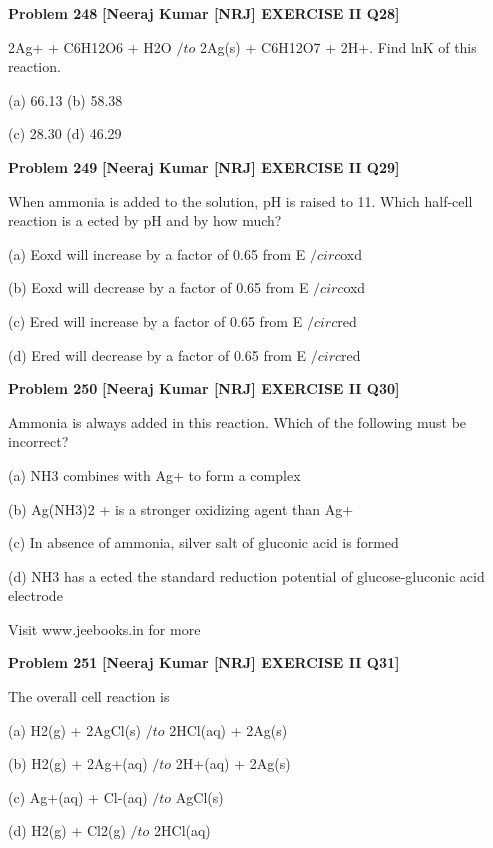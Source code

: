 \begin{problembox}
\textbf{Problem 248} \hfill \textbf{[Neeraj Kumar [NRJ] EXERCISE II Q28]}
\label{q:ext-nrj_all_questions-248}

2Ag+ + C6H12O6 + H2O $/to$ 2Ag(s) + C6H12O7 + 
2H+. Find lnK of this reaction.
 
 (a) 66.13 
(b) 58.38
 
 (c) 28.30 
(d) 46.29
\end{problembox}

\begin{problembox}
\textbf{Problem 249} \hfill \textbf{[Neeraj Kumar [NRJ] EXERCISE II Q29]}
\label{q:ext-nrj_all_questions-249}

When ammonia is added to the solution, pH is 
raised to 11. Which half-cell reaction is a  ected by 
pH and by how much?
 
 (a)  Eoxd will increase by a factor of 0.65 from 
E $/circ$oxd
 
 (b)  Eoxd will decrease by a factor of 0.65 from 
E $/circ$oxd
 
 (c)  Ered will increase by a factor of 0.65 from E $/circ$red
 
 (d)  Ered will decrease by a factor of 0.65 from 
E $/circ$red
\end{problembox}

\begin{problembox}
\textbf{Problem 250} \hfill \textbf{[Neeraj Kumar [NRJ] EXERCISE II Q30]}
\label{q:ext-nrj_all_questions-250}

Ammonia is always added in this reaction. Which 
of the following must be incorrect?
 
 (a)  NH3 combines with Ag+ to form a complex
 
 (b)  Ag(NH3)2
+ is a stronger oxidizing agent than 
Ag+
 
 (c)  In absence of ammonia, silver salt of gluconic 
acid is formed
 
 (d)  NH3 has a  ected the standard reduction 
potential of glucose-gluconic acid electrode
 
 
Visit www.jeebooks.in for more
\end{problembox}

\begin{problembox}
\textbf{Problem 251} \hfill \textbf{[Neeraj Kumar [NRJ] EXERCISE II Q31]}
\label{q:ext-nrj_all_questions-251}

The overall cell reaction is
 
 (a)  H2(g) + 2AgCl(s) $/to$ 2HCl(aq) + 2Ag(s)
 
 (b) H2(g) + 2Ag+(aq) $/to$ 2H+(aq) + 2Ag(s)
 
 (c) Ag+(aq) + Cl-(aq) $/to$ AgCl(s)
 
 (d) H2(g) + Cl2(g) $/to$ 2HCl(aq)
\end{problembox}

